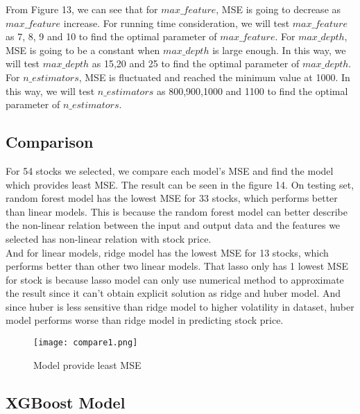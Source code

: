 \documentclass[fleqn,10pt]{SelfArx} %
\begin{document}
\noindent 
From Figure 13, we can see that for $max\_feature$, MSE is going to decrease as $max\_feature$ increase. For running time consideration, we will test $max\_feature$ as 7, 8, 9 and 10 to find the optimal parameter of $max\_feature$. For $max\_depth$, MSE is going to be a constant when $max\_depth$ is large enough. In this way, we will test $max\_depth$ as 15,20 and 25 to find the optimal parameter of $max\_depth$. For $n\_estimators$, MSE is fluctuated and reached the minimum value at 1000. In this way, we will test $n\_estimators$ as 800,900,1000 and 1100 to find the optimal parameter of $n\_estimators$.\\

\subsection{Comparison}
For 54 stocks we selected, we compare each model's MSE and find the model which provides least MSE. The result can be seen in the figure 14. On testing set, random forest model has the lowest MSE for 33 stocks, which performs better than linear models. This is because the random forest model can better describe the non-linear relation between the input and output data and the features we selected has non-linear relation with stock price. \\
\newline
And for linear models, ridge model has the lowest MSE for 13 stocks, which performs better than other two linear models. That lasso only has 1 lowest MSE for stock is because lasso model can only use numerical method to approximate the result since it can't obtain explicit solution as ridge and huber model. And since huber is less sensitive than ridge model to higher volatility in dataset, huber model performs worse than ridge model in predicting stock price. \\
\newline
\begin{figure}[ht]\centering
\texttt{[image: compare1.png]}
\caption{Model provide least MSE}
\label{fig:results}
\end{figure}
\noindent

\subsection{XGBoost Model}
\end{document}
